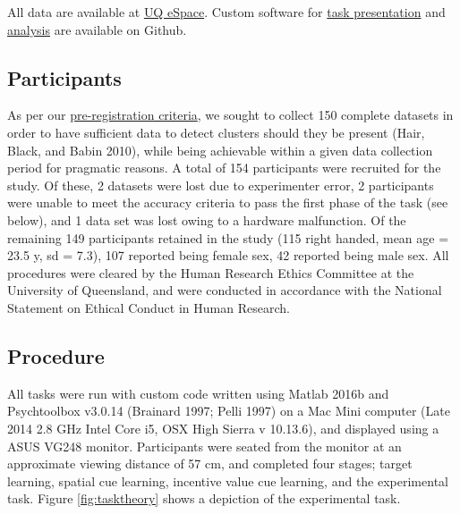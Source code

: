 \documentclass[11pt,halfline,a4paper,]{ouparticle}
\begin{document}
\label{sec:Method}

All data are available at \href{https://espace.library.uq.edu.au/view/UQ:d42fa1a}{UQ eSpace}. Custom software for \href{https://github.com/kel-github/imaging-cert-reward-att-task-code}{task presentation} and \href{https://github.com/kel-github/attention-clusters}{analysis} are available on Github.

\hypertarget{participants}{%
\subsection{Participants}\label{participants}}

\label{sec:Participants}

As per our \href{https://osf.io/erz4u/?view_only=68eaee13f7af49e2b2bae30d57570e5f}{pre-registration criteria}, we sought to collect 150 complete datasets in order to have sufficient data to detect clusters should they be present (Hair, Black, and Babin 2010), while being achievable within a given data collection period for pragmatic reasons. A total of 154 participants were recruited for the study. Of these, 2 datasets were lost due to experimenter error, 2 participants were unable to meet the accuracy criteria to pass the first phase of the task (see below), and 1 data set was lost owing to a hardware malfunction. Of the remaining 149 participants retained in the study (115 right handed, mean age = 23.5 y, sd = 7.3), 107 reported being female sex, 42 reported being male sex. All procedures were cleared by the Human Research Ethics Committee at the University of Queensland, and were conducted in accordance with the National Statement on Ethical Conduct in Human Research.

\hypertarget{procedure}{%
\subsection{Procedure}\label{procedure}}

\label{sec:Procedure}

All tasks were run with custom code written using Matlab 2016b and Psychtoolbox v3.0.14 (Brainard 1997; Pelli 1997) on a Mac Mini computer (Late 2014 2.8 GHz Intel Core i5, OSX High Sierra v 10.13.6), and displayed using a ASUS VG248 monitor. Participants were seated from the monitor at an approximate viewing distance of 57 cm, and completed four stages; target learning, spatial cue learning, incentive value cue learning, and the experimental task. Figure \ref{fig:tasktheory} shows a depiction of the experimental task.
\end{document}
